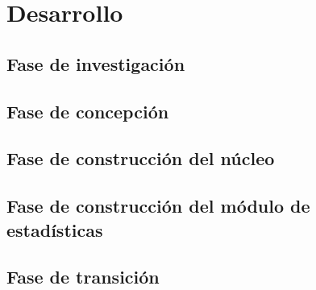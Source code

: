 \chapter{\textbf{Desarrollo}}

\thispagestyle{empty}

\section{Fase de investigación}
\section{Fase de concepción}
\section{Fase de construcción del núcleo}
\section{Fase de construcción del módulo de estadísticas}
\section{Fase de transición}
